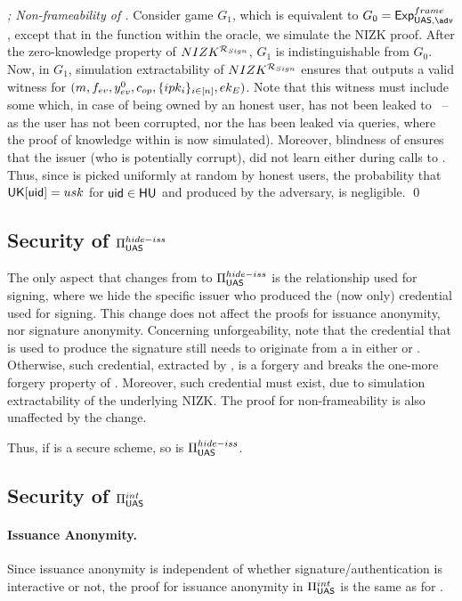 \begin{proof}[; Non-frameability of \CUASGen]
  Consider game $G_1$, which is equivalent to $G_0 = \ExpNonframe$, except that
  in the \Sign function within the \SIGN oracle, we simulate the NIZK proof.
  After the zero-knowledge property of $NIZK^{\mathcal{R}_{Sign}}$, $G_1$ is
  indistinguishable from $G_0$. Now, in $G_1$, simulation extractability of
  $NIZK^{\mathcal{R}_{Sign}}$ ensures that \ExtractSign outputs a valid
  witness for $(m,f_{ev},y_{ev}^0,c_{op},\lbrace ipk_i \rbrace_{i\in[n]},
  ek_{E})$. Note that this witness must include some \usk which, in case of
  being owned by an honest user, has not been leaked to \adv~--as the user
  has not been corrupted, nor the \usk has been leaked via \SIGN queries,
  where the proof of knowledge within \Sign is now simulated). Moreover,
  blindness of \SBCM ensures that the issuer (who is potentially corrupt), did
  not learn \usk either during calls to \OBTAIN. Thus, since \usk is picked
  uniformly at random by honest users, the probability that $\mathsf{UK}[\mathsf{uid}] = usk$
  for $\mathsf{uid} \in \mathsf{HU}$ and \Sig produced by the adversary, is negligible.
  \qed
\end{proof}

\subsection{Security of $\Pi_{\mathsf{UAS}}^{hide-iss}$}
\label{sapp:sec-hide-iss}

The only aspect that changes from \CUASGen to $\Pi_{\mathsf{UAS}}^{hide-iss}$ is the
relationship used for signing, where we hide the specific issuer who produced
the (now only) credential used for signing.
%
This change does not affect the proofs for issuance anonymity, nor signature
anonymity.
%
Concerning unforgeability, note that the credential that is used to produce the
\UAS signature still needs to originate from a \uid in either \HU or \CU.
Otherwise, such credential, extracted by \ExtractSign, is a forgery and breaks
the one-more forgery property of \SBCM. Moreover, such credential must exist,
due to simulation extractability of the underlying NIZK.
%
The proof for non-frameability is also unaffected by the change.

Thus, if \CUASGen is a secure \UAS scheme, so is $\Pi_{\mathsf{UAS}}^{hide-iss}$.

\subsection{Security of $\Pi_{\mathsf{UAS}}^{int}$}
\label{sapp:sec-interactive}

\paragraph{Issuance Anonymity.} Since issuance anonymity is independent of
whether signature/authentication is interactive or not, the proof for issuance
anonymity in $\Pi_{\mathsf{UAS}}^{int}$ is the same as for \CUASGen.

